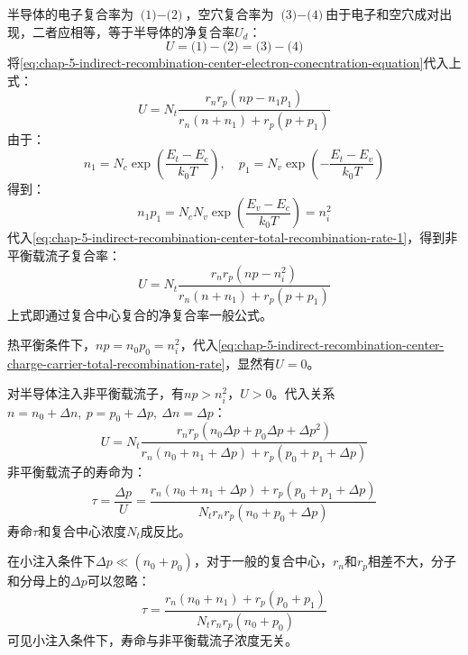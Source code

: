 半导体的电子复合率为 $\text{(1)}-\text{(2)}$，空穴复合率为 $\text{(3)}-\text{(4)}$由于电子和空穴成对出现，二者应相等，等于半导体的净复合率$U_d$：
\begin{equation}
    U=\text{(1)}-\text{(2)}=\text{(3)}-\text{(4)}
\end{equation}
将\autoref{eq:chap-5-indirect-recombination-center-electron-conecntration-equation}代入上式：
\begin{equation}
    U=N_t\frac{r_nr_p\left(np-n_1p_1\right)}{r_n(n+n_1)+r_p(p+p_1)}\label{eq:chap-5-indirect-recombination-center-total-recombination-rate-1}
\end{equation}
由于：
\begin{equation}
    n_1=N_c\exp{\left(\frac{E_t-E_c}{k_0T}\right)},\quad p_1=N_v\exp{\left(-\frac{E_t-E_v}{k_0T}\right)}
\end{equation}
得到：
\begin{equation}
    n_1p_1=N_cN_v\exp{\left(\frac{E_v-E_c}{k_0T}\right)}=n_i^2
\end{equation}
代入\autoref{eq:chap-5-indirect-recombination-center-total-recombination-rate-1}，得到非平衡载流子复合率：
\begin{equation}
    U=N_t\frac{r_nr_p\left(np-n_i^2\right)}{r_n(n+n_1)+r_p(p+p_1)}\label{eq:chap-5-indirect-recombination-center-charge-carrier-total-recombination-rate}
\end{equation}
上式即通过复合中心复合的净复合率一般公式。

热平衡条件下，$np=n_0p_0=n_i^2$，代入\autoref{eq:chap-5-indirect-recombination-center-charge-carrier-total-recombination-rate}，显然有$U=0$。

对半导体注入非平衡载流子，有$np>n_i^2$，$U>0$。代入关系$n=n_0+\Delta n,\ p=p_0+\Delta p,\ \Delta n=\Delta p$：
\begin{equation}
    U=N_t\frac{r_nr_p\left(n_0\Delta p+p_0\Delta p+\Delta p^2\right)}{r_n\left(n_0+n_1+\Delta p\right)+r_p\left(p_0+p_1+\Delta p\right)}
\end{equation}
非平衡载流子的寿命为：
\begin{equation}
    \tau=\frac{\Delta p}{U}=\frac{r_n\left(n_0+n_1+\Delta p\right)+r_p\left(p_0+p_1+\Delta p\right)}{N_tr_nr_p(n_0+p_0+\Delta p)}
\end{equation}
寿命$\tau$和复合中心浓度$N_t$成反比。

在小注入条件下$\Delta p\ll (n_0+p_0)$，对于一般的复合中心，$r_n$和$r_p$相差不大，分子和分母上的$\Delta p$可以忽略：
\begin{equation}
    \tau=\frac{r_n(n_0+n_1)+r_p(p_0+p_1)}{N_tr_nr_p(n_0+p_0)}
\end{equation}
可见小注入条件下，寿命与非平衡载流子浓度无关。

